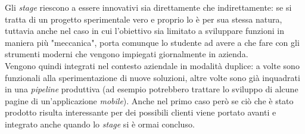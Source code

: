 Gli \textit{stage} riescono a essere innovativi sia direttamente che indirettamente: se si tratta di un progetto sperimentale vero e proprio lo è per sua stessa natura, tuttavia anche nel caso in cui l'obiettivo sia limitato a sviluppare funzioni in maniera più "meccanica", porta comunque lo studente ad avere a che fare con gli strumenti moderni che vengono impiegati giornalmente in azienda.\\
Vengono quindi integrati nel contesto aziendale in modalità duplice: a volte sono funzionali alla sperimentazione di nuove soluzioni, altre volte sono già inquadrati in una \textit{pipeline} produttiva (ad esempio potrebbero trattare lo sviluppo di alcune pagine di un'applicazione \textit{mobile}). Anche nel primo caso però se ciò che è stato prodotto risulta interessante per dei possibili clienti viene portato avanti e integrato anche quando lo \textit{stage} si è ormai concluso.
